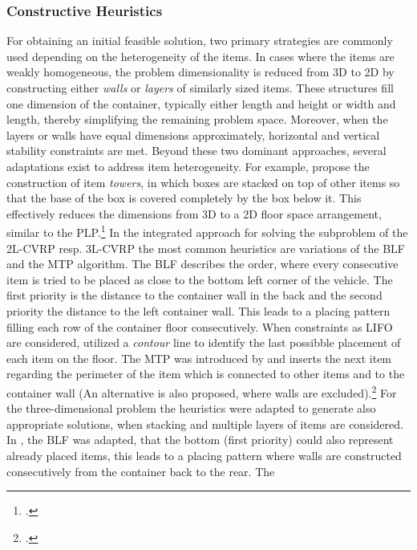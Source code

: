 \subsubsection{Constructive Heuristics}
For obtaining an initial feasible solution, two primary strategies are commonly
used depending on the heterogeneity of the items. In cases where the items are weakly homogeneous,
the problem dimensionality is reduced from 3D to 2D by constructing either
\textit{walls} or \textit{layers} of similarly sized items. These structures fill one
dimension of the container, typically either length and height or width and length, thereby
simplifying the remaining problem space. Moreover, when the layers or walls have
equal dimensions approximately, horizontal and vertical stability constraints are met.
Beyond these two dominant approaches, several adaptations exist to address item heterogeneity.
For example, \textcite{gehring_genetic_1997} propose the construction of item
\textit{towers}, in which boxes are stacked on top of other items so that the base of the box is covered completely
by the box below it. This effectively reduces the dimensions from 3D to a 2D floor space arrangement,
similar to the \gls{PLP}.\footcite[cf.][pp. 402--406]{gehring_genetic_1997}
In the integrated approach for solving the subproblem of the \gls{2L-CVRP} resp. \gls{3L-CVRP}
the most common heuristics are variations of the \gls{BLF}
and the \gls{MTP} algorithm. The \gls{BLF} describes the order, where
every consecutive item is tried to be placed as close to the bottom left corner of the vehicle. The
first priority is the distance to the container wall in the back and the second priority the distance
to the left container wall. This leads to a placing pattern filling each row of the container floor
consecutively.
When constraints as \gls{LIFO} are considered, \cite{iori_exact_2007} utilized a \textit{contour} line
to identify the last possibble placement of each item on the floor. The \gls{MTP} was introduced by
\cite{zachariadis_guided_2009} and inserts the next item regarding the perimeter of the item which is connected
to other items and to the container wall (An alternative is also proposed, where walls are excluded).\footcite[cf.][p.732f]{zachariadis_guided_2009}
For the three-dimensional problem the heuristics were adapted to generate also appropriate solutions, when
stacking and multiple layers of items are considered. In \cite{gendreau_tabu_2006}, the \gls{BLF}
was adapted, that the bottom (first priority) could also represent already placed items, this leads
to a placing pattern where walls are constructed consecutively from the container back to the rear. The
